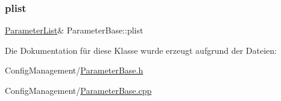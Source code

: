 \subsubsection{\texorpdfstring{plist}{plist}}
{\footnotesize\ttfamily \hyperlink{class_parameter_list}{Parameter\+List}\& Parameter\+Base\+::plist}



Die Dokumentation für diese Klasse wurde erzeugt aufgrund der Dateien\+:\begin{DoxyCompactItemize}
\item 
Config\+Management/\hyperlink{_parameter_base_8h}{Parameter\+Base.\+h}\item 
Config\+Management/\hyperlink{_parameter_base_8cpp}{Parameter\+Base.\+cpp}\end{DoxyCompactItemize}
